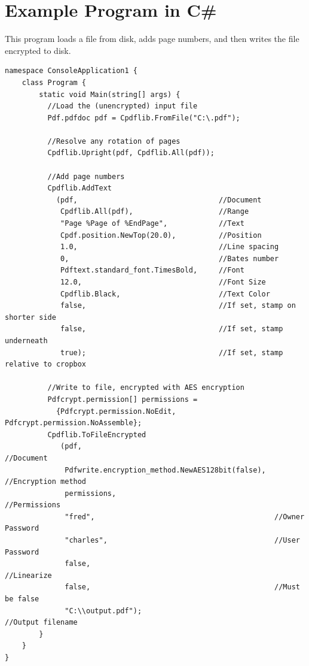 \documentclass[a4paper]{memoir}
\begin{document}
\chapter{Example Program in C\#}
This program loads a file from disk, adds page numbers, and then writes the file encrypted to disk.
\begin{small}
\begin{verbatim}
namespace ConsoleApplication1 {
    class Program {
        static void Main(string[] args) {
          //Load the (unencrypted) input file
          Pdf.pdfdoc pdf = Cpdflib.FromFile("C:\.pdf");

          //Resolve any rotation of pages
          Cpdflib.Upright(pdf, Cpdflib.All(pdf));

          //Add page numbers
          Cpdflib.AddText
            (pdf,                                 //Document
             Cpdflib.All(pdf),                    //Range
             "Page %Page of %EndPage",            //Text
             Cpdf.position.NewTop(20.0),          //Position
             1.0,                                 //Line spacing
             0,                                   //Bates number
             Pdftext.standard_font.TimesBold,     //Font
             12.0,                                //Font Size
             Cpdflib.Black,                       //Text Color
             false,                               //If set, stamp on shorter side
             false,                               //If set, stamp underneath
             true);                               //If set, stamp relative to cropbox

          //Write to file, encrypted with AES encryption
          Pdfcrypt.permission[] permissions =
            {Pdfcrypt.permission.NoEdit, Pdfcrypt.permission.NoAssemble};
          Cpdflib.ToFileEncrypted
             (pdf,                                             //Document
              Pdfwrite.encryption_method.NewAES128bit(false),  //Encryption method
              permissions,                                     //Permissions
              "fred",                                          //Owner Password
              "charles",                                       //User Password
              false,                                           //Linearize
              false,                                           //Must be false
              "C:\\output.pdf");                               //Output filename
        }
    }
}
\end{verbatim}
\end{small}
\end{document}
